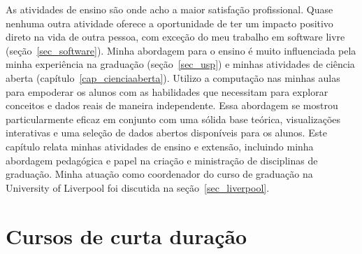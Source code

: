 \documentclass[10pt,a4paper,oneside]{book}
\begin{document}
As atividades de ensino são onde acho a maior satisfação profissional.
Quase nenhuma outra atividade oferece a oportunidade de ter um impacto positivo
direto na vida de outra pessoa, com exceção do meu trabalho em software livre
(seção~\ref{sec_software}).
Minha abordagem para o ensino é muito influenciada pela minha experiência na
graduação (seção~\ref{sec_usp}) e minhas atividades de ciência aberta
(capítulo~\ref{cap_cienciaaberta}).
Utilizo a computação nas minhas aulas para empoderar os alunos com as
habilidades que necessitam para explorar conceitos e dados reais de maneira
independente.
Essa abordagem se mostrou particularmente eficaz em conjunto com uma sólida
base teórica, visualizações interativas e uma seleção de dados abertos
disponíveis para os alunos.
Este capítulo relata minhas atividades de ensino e extensão, incluindo minha
abordagem pedagógica e papel na criação e ministração de disciplinas de
graduação.
Minha atuação como coordenador do curso de graduação na University of Liverpool
foi discutida na seção~\ref{sec_liverpool}.

\section{Cursos de curta duração}
\label{sec_workshops}
\end{document}
